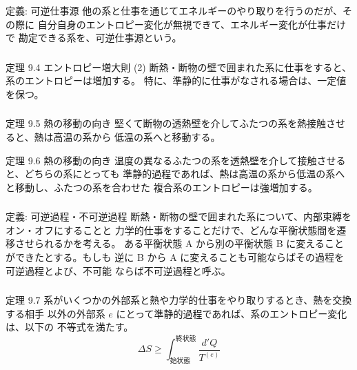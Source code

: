 \documentclass[aspectratio=149]{beamer}
\begin{document}
\begin{frame}
	\frametitle{}
	\begin{block}{定義: 可逆仕事源}
		他の系と仕事を通じてエネルギーのやり取りを行うのだが、その際に
		自分自身のエントロピー変化が無視できて、エネルギー変化が仕事だけで
		勘定できる系を、可逆仕事源という。
	\end{block}
\end{frame}

\begin{frame}
	\frametitle{}
	\begin{block}{定理 9.4 エントロピー増大則 (2)}
		断熱・断物の壁で囲まれた系に仕事をすると、系のエントロピーは増加する。
		特に、準静的に仕事がなされる場合は、一定値を保つ。
	\end{block}
\end{frame}

\begin{frame}
	\frametitle{}
	\begin{block}{定理 9.5 熱の移動の向き}
		堅くて断物の透熱壁を介してふたつの系を熱接触させると、熱は高温の系から
		低温の系へと移動する。
	\end{block}
	\begin{block}{定理 9.6 熱の移動の向き}
		温度の異なるふたつの系を透熱壁を介して接触させると、どちらの系にとっても
		準静的過程であれば、熱は高温の系から低温の系へと移動し、ふたつの系を合わせた
		複合系のエントロピーは強増加する。
	\end{block}
\end{frame}

\begin{frame}
	\frametitle{}
	\begin{block}{定義: 可逆過程・不可逆過程}
		断熱・断物の壁で囲まれた系について、内部束縛をオン・オフにすることと
		力学的仕事をすることだけで、どんな平衡状態間を遷移させられるかを考える。
		ある平衡状態 A から別の平衡状態 B に変えることができたとする。もしも
		逆に B から A に変えることも可能ならばその過程を可逆過程とよび、不可能
		ならば不可逆過程と呼ぶ。
	\end{block}
\end{frame}

\begin{frame}
	\frametitle{}
	\begin{block}{定理 9.7}
		系がいくつかの外部系と熱や力学的仕事をやり取りするとき、熱を交換する相手
		以外の外部系 \(e\) にとって準静的過程であれば、系のエントロピー変化は、以下の
		不等式を満たす。
		\[\Delta S\geq\int^{\text{終状態}}_{\text{始状態}}\frac{d'Q}{T^{(e)}}\tag{9.13}\]
	\end{block}
\end{frame}
\end{document}
